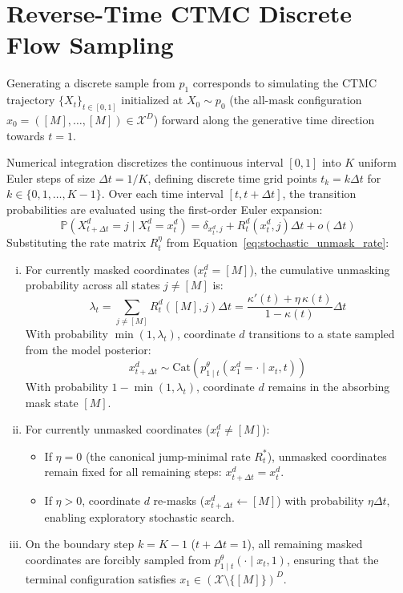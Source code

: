 \section{Reverse-Time CTMC Discrete Flow Sampling}

Generating a discrete sample from $p_1$ corresponds to simulating the CTMC trajectory $\{X_t\}_{t \in [0, 1]}$ initialized at $X_0 \sim p_0$ (the all-mask configuration $x_0 = ([M], \dots, [M]) \in \mathcal{X}^D$) forward along the generative time direction towards $t = 1$. 

Numerical integration discretizes the continuous interval $[0, 1]$ into $K$ uniform Euler steps of size $\Delta t = 1/K$, defining discrete time grid points $t_k = k \Delta t$ for $k \in \{0, 1, \dots, K-1\}$. Over each time interval $[t, t + \Delta t]$, the transition probabilities are evaluated using the first-order Euler expansion:
\begin{equation}
\mathbb{P}(X_{t+\Delta t}^d = j \mid X_t^d = x_t^d) = \delta_{x_t^d, j} + R_t^d(x_t^d, j) \Delta t + o(\Delta t)
\label{eq:euler_transition_expansion}
\end{equation}
Substituting the rate matrix $R_t^\eta$ from Equation~\ref{eq:stochastic_unmask_rate}:
\begin{enumerate}[(i)]
\item For currently masked coordinates ($x_t^d = [M]$), the cumulative unmasking probability across all states $j \ne [M]$ is:
\begin{equation}
\lambda_t = \sum_{j \ne [M]} R_t^d([M], j) \Delta t = \frac{\kappa'(t) + \eta \, \kappa(t)}{1 - \kappa(t)} \Delta t
\label{eq:sampling_unmask_prob}
\end{equation}
With probability $\min(1, \lambda_t)$, coordinate $d$ transitions to a state sampled from the model posterior:
\begin{equation}
x_{t+\Delta t}^d \sim \text{Cat}\left( p_{1 \mid t}^\theta(x_1^d = \cdot \mid x_t, t) \right)
\end{equation}
With probability $1 - \min(1, \lambda_t)$, coordinate $d$ remains in the absorbing mask state $[M]$.
\item For currently unmasked coordinates ($x_t^d \ne [M]$):
\begin{itemize}
\item If $\eta = 0$ (the canonical jump-minimal rate $R_t^*$), unmasked coordinates remain fixed for all remaining steps: $x_{t+\Delta t}^d = x_t^d$.
\item If $\eta > 0$, coordinate $d$ re-masks ($x_{t+\Delta t}^d \gets [M]$) with probability $\eta \Delta t$, enabling exploratory stochastic search.
\end{itemize}
\item On the boundary step $k = K - 1$ ($t + \Delta t = 1$), all remaining masked coordinates are forcibly sampled from $p_{1 \mid t}^\theta(\cdot \mid x_t, 1)$, ensuring that the terminal configuration satisfies $x_1 \in (\mathcal{X} \setminus \{[M]\})^D$.
\end{enumerate}


